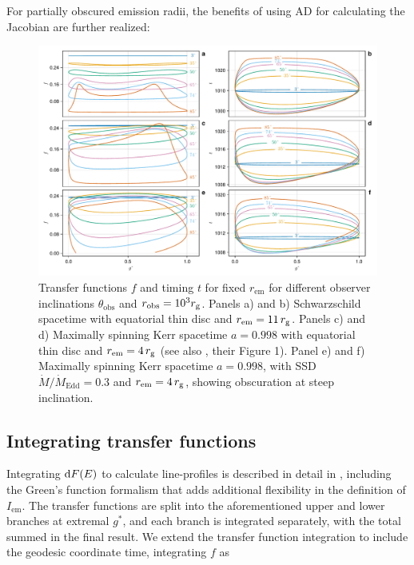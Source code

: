 For partially obscured emission radii, the benefits of using AD for calculating the Jacobian are further realized: 


\begin{figure}
    \centering
    \includegraphics[width=0.99\linewidth]{figures/transfer-functions.plots.pdf}
    \caption{Transfer functions $f$ and timing $t$ for fixed $r_\text{em}$ for different observer inclinations $\theta_\text{obs}$ and $r_\text{obs} = 10^3 r_\text{g}$. Panels a) and b) Schwarzschild spacetime with equatorial thin disc and $r_\text{em} = 11\, r_\text{g}$. Panels c) and d) Maximally spinning Kerr spacetime $a=0.998$ with equatorial thin disc and $r_\text{em} = 4 \, r_\text{g}$ (see also \citealp{bambi_testing_2017}, their Figure 1). Panel e) and f) Maximally spinning Kerr spacetime $a=0.998$, with SSD $\dot{M} / \dot{M}_\text{Edd} = 0.3$ and $r_\text{em} = 4\, r_\text{g}$, showing obscuration at steep inclination.}
    \label{fig:transfer-functions}
\end{figure}

\subsection{Integrating transfer functions}
\label{sec:transfer-function-integration}

Integrating $\text{d} F(E)$ to calculate line-profiles is described in detail in \cite{dauser_broad_2010}, including the Green's function formalism that adds additional flexibility in the definition of $I_\text{em}$. The transfer functions are split into the aforementioned upper and lower branches at extremal $g^\ast$, and each branch is integrated separately, with the total summed in the final result. We extend the transfer function integration to include the geodesic coordinate time, integrating $f$ as

